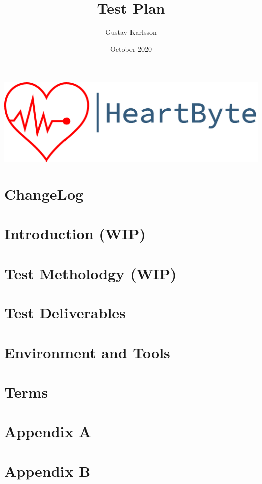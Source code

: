 \documentclass{article}
\title{Test Plan}
\author{Gustav Karlsson }
\date{October 2020}
\begin{document}
\maketitle
\vfill
\includegraphics[width=\linewidth]{Pictures/logo_heartbyte_transparent_v_1_1 (1)}

    \vfill
\clearpage


\section*{ChangeLog}


\clearpage
\section{Introduction (WIP)}


\section{Test Metholodgy (WIP)}


\section{Test Deliverables}

\section{Environment and Tools}

\section{Terms}

\section*{Appendix A}

\section*{Appendix B}
\end{document}
